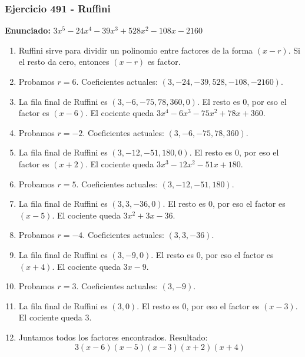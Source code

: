 \documentclass[11pt,a4paper]{article}
\begin{document}
\subsubsection*{Ejercicio 491 - Ruffini}
\textbf{Enunciado:} $ 3 x^{5} - 24 x^{4} - 39 x^{3} + 528 x^{2} - 108 x - 2160 $\par
\begin{enumerate}[leftmargin=2em]
\item Ruffini sirve para dividir un polinomio entre factores de la forma \((x-r)\). Si el resto da cero, entonces \((x-r)\) es factor.
\item Probamos \(r=6\). Coeficientes actuales: \((3, -24, -39, 528, -108, -2160)\).
\item La fila final de Ruffini es \((3, -6, -75, 78, 360, 0)\). El resto es \(0\), por eso el factor es \((x-6)\). El cociente queda \(3 x^{4} - 6 x^{3} - 75 x^{2} + 78 x + 360\).
\item Probamos \(r=-2\). Coeficientes actuales: \((3, -6, -75, 78, 360)\).
\item La fila final de Ruffini es \((3, -12, -51, 180, 0)\). El resto es \(0\), por eso el factor es \((x+2)\). El cociente queda \(3 x^{3} - 12 x^{2} - 51 x + 180\).
\item Probamos \(r=5\). Coeficientes actuales: \((3, -12, -51, 180)\).
\item La fila final de Ruffini es \((3, 3, -36, 0)\). El resto es \(0\), por eso el factor es \((x-5)\). El cociente queda \(3 x^{2} + 3 x - 36\).
\item Probamos \(r=-4\). Coeficientes actuales: \((3, 3, -36)\).
\item La fila final de Ruffini es \((3, -9, 0)\). El resto es \(0\), por eso el factor es \((x+4)\). El cociente queda \(3 x - 9\).
\item Probamos \(r=3\). Coeficientes actuales: \((3, -9)\).
\item La fila final de Ruffini es \((3, 0)\). El resto es \(0\), por eso el factor es \((x-3)\). El cociente queda \(3\).
\item Juntamos todos los factores encontrados. Resultado: \[\boxed{3 \left(x - 6\right) \left(x - 5\right) \left(x - 3\right) \left(x + 2\right) \left(x + 4\right)}\]
\end{enumerate}

\vspace{0.2cm}
\end{document}
